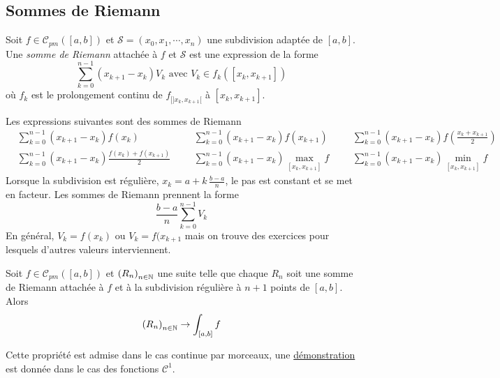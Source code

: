 \subsection{Sommes de Riemann}
\begin{defi}
 Soit $f\in \mathcal{C}_{pm}([a,b])$ et $\mathcal{S}=(x_0,x_1,\cdots,x_n)$ une subdivision adaptée de $[a,b]$. Une \emph{somme de Riemann} attachée à $f$ et $\mathcal{S}$ est une expression de la forme
\begin{displaymath}
 \sum_{k=0}^{n-1}(x_{k+1}-x_k)V_k \text{ avec } V_k\in f_k([x_k,x_{k+1}])
\end{displaymath}
où $f_k$ est le prolongement continu de $f_{\left|]x_k,x_{k+1}[\right. }$ à $[x_k,x_{k+1}]$.
\end{defi}
\begin{exples}
 Les expressions suivantes sont des sommes de Riemann
\begin{align*}
 &\sum_{k=0}^{n-1}(x_{k+1}-x_k)f(x_k) & & &\sum_{k=0}^{n-1}(x_{k+1}-x_k)f(x_{k+1})
 & & &\sum_{k=0}^{n-1}(x_{k+1}-x_k)f(\frac{x_k + x_{k+1}}{2}) \\
 &\sum_{k=0}^{n-1}(x_{k+1}-x_k)\frac{f(x_{k})+f(x_{k+1})}{2}
 & & &\sum_{k=0}^{n-1}(x_{k+1}-x_k)\max_{[x_k,x_{k+1}]}f & & &\sum_{k=0}^{n-1}(x_{k+1}-x_k)\min_{[x_k,x_{k+1}]}f
\end{align*}
Lorsque la subdivision est régulière, $x_k = a + k\,\frac{b-a}{n}$, le pas est constant et se met en facteur. Les sommes de Riemann prennent la forme
\begin{displaymath}
 \frac{b-a}{n}\sum_{k=0}^{n-1}V_k
\end{displaymath}
En général, $V_k = f(x_k)$ ou $V_k = f(x_{k+1}$ mais on trouve des exercices pour lesquels d'autres valeurs interviennent.
\end{exples}
\begin{propn}
 Soit $f\in \mathcal{C}_{pm}([a,b])$ et $\left(R_n\right) _{n\in \mathbb{N}}$ une suite telle que chaque $R_n$ soit une somme de Riemann attachée à $f$ et à la subdivision régulière à $n+1$ points de $[a,b]$. Alors 
\begin{displaymath}
 \left(R_n\right) _{n\in \mathbb{N}} \rightarrow \int_{[a,b]}f
\end{displaymath}
\end{propn}
\begin{demo}
 Cette propriété est admise dans le cas continue par morceaux, une \href{\baseurl/C2190.pdf}{démonstration} est donnée dans le cas des fonctions $\mathcal{C}^1$.
\end{demo}

